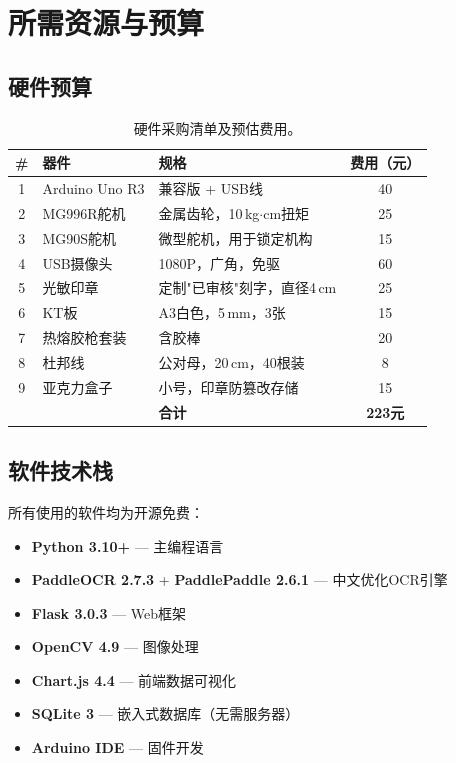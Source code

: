 \documentclass[conference]{IEEEtran}
\begin{document}
\section{所需资源与预算}

\subsection{硬件预算}

\begin{table}[H]
\centering
\caption{硬件采购清单及预估费用。}
\label{tab:budget}
\begin{tabular}{@{}cllc@{}}
\toprule
\textbf{\#} & \textbf{器件} & \textbf{规格} & \textbf{费用（元）} \\
\midrule
1 & Arduino Uno R3 & 兼容版 + USB线 & 40 \\
2 & MG996R舵机 & 金属齿轮，10\,kg$\cdot$cm扭矩 & 25 \\
3 & MG90S舵机 & 微型舵机，用于锁定机构 & 15 \\
4 & USB摄像头 & 1080P，广角，免驱 & 60 \\
5 & 光敏印章 & 定制"已审核"刻字，直径4\,cm & 25 \\
6 & KT板 & A3白色，5\,mm，3张 & 15 \\
7 & 热熔胶枪套装 & 含胶棒 & 20 \\
8 & 杜邦线 & 公对母，20\,cm，40根装 & 8 \\
9 & 亚克力盒子 & 小号，印章防篡改存储 & 15 \\
\midrule
 & & \textbf{合计} & \textbf{223元} \\
\bottomrule
\end{tabular}
\end{table}

\subsection{软件技术栈}

所有使用的软件均为开源免费：

\begin{itemize}[leftmargin=*]
    \item \textbf{Python 3.10+} --- 主编程语言
    \item \textbf{PaddleOCR 2.7.3} + \textbf{PaddlePaddle 2.6.1} --- 中文优化OCR引擎
    \item \textbf{Flask 3.0.3} --- Web框架
    \item \textbf{OpenCV 4.9} --- 图像处理
    \item \textbf{Chart.js 4.4} --- 前端数据可视化
    \item \textbf{SQLite 3} --- 嵌入式数据库（无需服务器）
    \item \textbf{Arduino IDE} --- 固件开发
\end{itemize}
\end{document}
